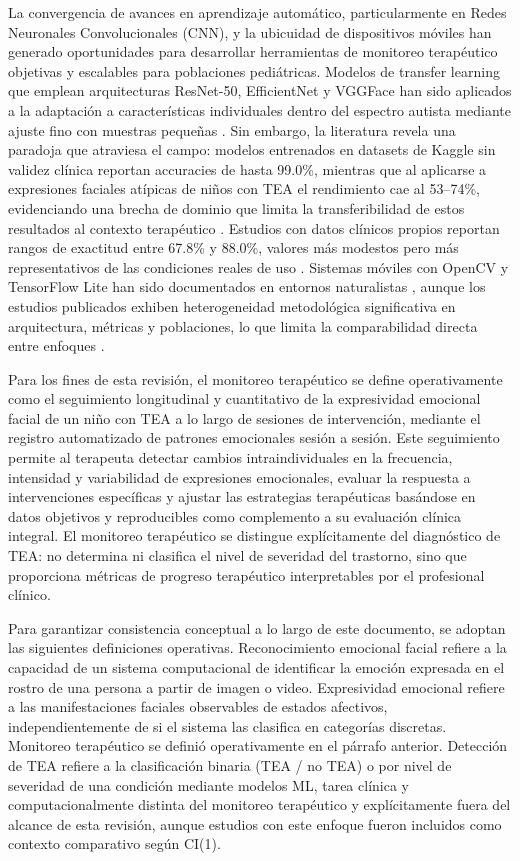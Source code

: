 \documentclass[3p,twocolumn,times]{elsarticle}
\begin{document}
	La convergencia de avances en aprendizaje automático, particularmente en Redes
	Neuronales Convolucionales (CNN), y la ubicuidad de dispositivos móviles han
	generado oportunidades para desarrollar herramientas de monitoreo terapéutico
	objetivas y escalables para poblaciones pediátricas. Modelos de transfer learning
	que emplean arquitecturas ResNet-50, EfficientNet y VGGFace han sido aplicados a
	la adaptación a características individuales dentro del espectro autista mediante
	ajuste fino con muestras pequeñas \cite{Ahmad2024}. Sin embargo, la literatura
	revela una paradoja que atraviesa el campo: modelos entrenados en datasets de
	Kaggle sin validez clínica reportan accuracies de hasta 99.0\%, mientras que al
	aplicarse a expresiones faciales atípicas de niños con TEA el rendimiento cae al
	53--74\%, evidenciando una brecha de dominio que limita la transferibilidad de
	estos resultados al contexto terapéutico \cite{Rhatassi2024}. Estudios con datos
	clínicos propios reportan rangos de exactitud entre 67.8\% y 88.0\%, valores más
	modestos pero más representativos de las condiciones reales de uso
	\cite{Johnson2025,Radocaj2025,Washington2022}. Sistemas móviles con OpenCV y
	TensorFlow Lite han sido documentados en entornos naturalistas \cite{Sholikah2024},
	aunque los estudios publicados exhiben heterogeneidad metodológica significativa
	en arquitectura, métricas y poblaciones, lo que limita la comparabilidad directa
	entre enfoques \cite{Radocaj2025}.
	
	Para los fines de esta revisión, el monitoreo terapéutico se define operativamente
	como el seguimiento longitudinal y cuantitativo de la expresividad emocional facial
	de un niño con TEA a lo largo de sesiones de intervención, mediante el registro
	automatizado de patrones emocionales sesión a sesión. Este seguimiento permite al
	terapeuta detectar cambios intraindividuales en la frecuencia, intensidad y
	variabilidad de expresiones emocionales, evaluar la respuesta a intervenciones
	específicas y ajustar las estrategias terapéuticas basándose en datos objetivos y
	reproducibles como complemento a su evaluación clínica integral. El monitoreo
	terapéutico se distingue explícitamente del diagnóstico de TEA: no determina ni
	clasifica el nivel de severidad del trastorno, sino que proporciona métricas de
	progreso terapéutico interpretables por el profesional clínico.
	
	Para garantizar consistencia conceptual a lo largo de este documento, se adoptan
	las siguientes definiciones operativas. Reconocimiento emocional facial refiere a
	la capacidad de un sistema computacional de identificar la emoción expresada en el
	rostro de una persona a partir de imagen o video. Expresividad emocional refiere a
	las manifestaciones faciales observables de estados afectivos, independientemente
	de si el sistema las clasifica en categorías discretas. Monitoreo terapéutico se
	definió operativamente en el párrafo anterior. Detección de TEA refiere a la
	clasificación binaria (TEA / no TEA) o por nivel de severidad de una condición
	mediante modelos ML, tarea clínica y computacionalmente distinta del monitoreo
	terapéutico y explícitamente fuera del alcance de esta revisión, aunque estudios
	con este enfoque fueron incluidos como contexto comparativo según CI(1).
	
\end{document}
